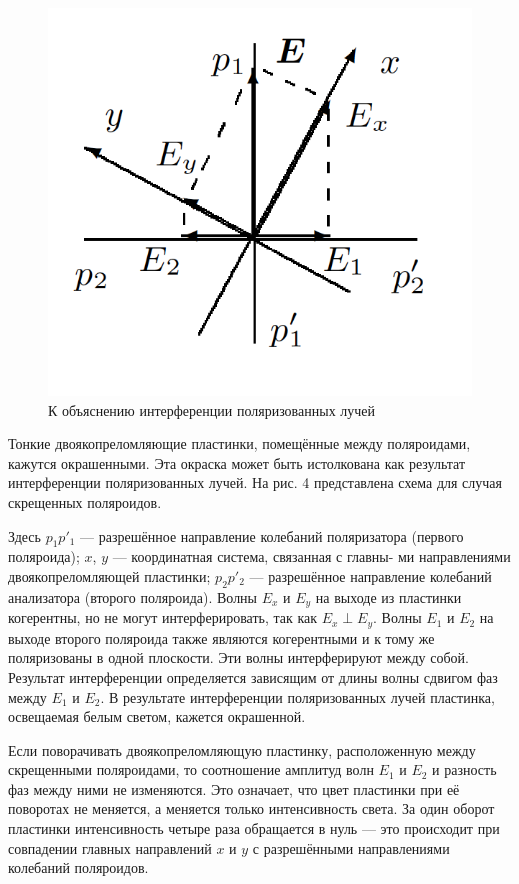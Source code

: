 \documentclass[12pt, a4paper]{article}
\begin{document}
\begin{figure}
    \includegraphics[width=\linewidth]{pics/4.png}
    \caption{К объяснению интерференции поляризованных лучей}
    \label{ris 4}
\end{figure}

Тонкие двоякопреломляющие пластинки, помещённые между поляроидами, кажутся
окрашенными. Эта окраска может быть истолкована как результат интерференции
поляризованных лучей. На рис. 4 представлена схема для случая скрещенных
поляроидов.

Здесь $ p_1 p'_1 $ --- разрешённое направление колебаний поляризатора (первого
поляроида); $x$, $y$ --- координатная система, связанная с главны- ми
направлениями двоякопреломляющей пластинки; $ p_2 p'_2 $ --- разрешённое
направление колебаний анализатора (второго поляроида). Волны $ E_x $ и $ E_y $
на выходе из пластинки когерентны, но не могут интерферировать, так как $ E_x
    \perp E_y $. Волны $ E_1 $ и $ E_2 $ на выходе второго поляроида также являются
когерентными и к тому же поляризованы в одной плоскости. Эти волны
интерферируют между собой. Результат интерференции определяется зависящим от
длины волны сдвигом фаз между $ E_1 $ и $ E_2 $. В результате интерференции
поляризованных лучей пластинка, освещаемая белым светом, кажется окрашенной.

Если поворачивать двоякопреломляющую пластинку, расположенную между скрещенными
поляроидами, то соотношение амплитуд волн $ E_1 $ и $ E_2 $ и разность фаз
между ними не изменяются. Это означает, что цвет пластинки при её поворотах не
меняется, а меняется только интенсивность света. За один оборот пластинки
интенсивность четыре раза обращается в нуль --- это происходит при совпадении
главных направлений $ x $ и $ y $ с разрешёнными направлениями колебаний
поляроидов.
\end{document}
